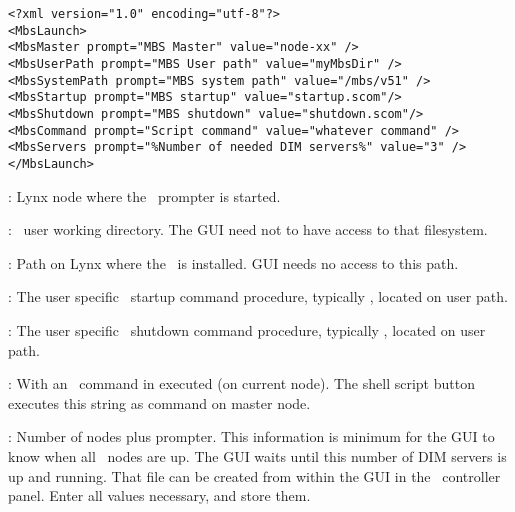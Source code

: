{\small \begin{verbatim}
<?xml version="1.0" encoding="utf-8"?>
<MbsLaunch>
<MbsMaster prompt="MBS Master" value="node-xx" />
<MbsUserPath prompt="MBS User path" value="myMbsDir" />
<MbsSystemPath prompt="MBS system path" value="/mbs/v51" />
<MbsStartup prompt="MBS startup" value="startup.scom"/>
<MbsShutdown prompt="MBS shutdown" value="shutdown.scom"/>
<MbsCommand prompt="Script command" value="whatever command" />
<MbsServers prompt="%Number of needed DIM servers%" value="3" />
</MbsLaunch>
\end{verbatim}
}
\bdes
\item[MbsMaster]: Lynx node where the \mbs\ prompter is started.
\item[MbsUserPath]: \mbs\ user working directory. The GUI need not to have
access to that filesystem.
\item[MbsSystemPath]:  Path on Lynx where the \mbs\ is installed. GUI needs no access to this path.
\item[MbsStartup]: The user specific \mbs\ startup command procedure, typically ,
located on user path.
\item[MbsShutdown]: The user specific \mbs\ shutdown command procedure, typically ,
located on user path.
\item[MbsCommand]: With  an \mbs\ command in executed (on current node).
The shell script button executes this string as  command on master node.
\item[MbsServers]: Number of nodes plus prompter. This information
is minimum for the GUI to know when all \mbs\ nodes are up. The GUI waits until
this number of DIM servers is up and running.
\edes
That file can be created from within the GUI in the \mbs\  controller panel.
Enter all values necessary, and store them. 


